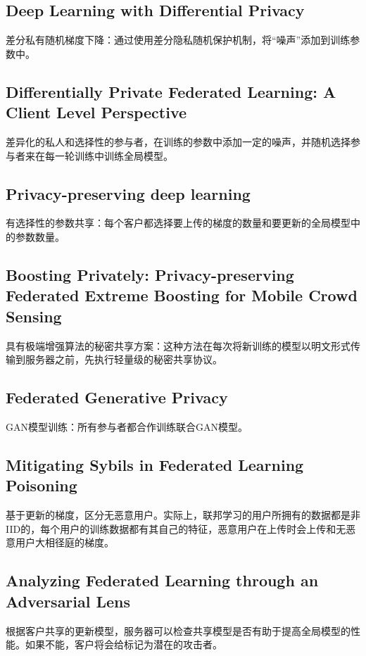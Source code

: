 \documentclass[12pt, a4paper]{article}
\begin{document}
        \subsection*{Deep Learning with Differential Privacy\cite{Abadi_2016}}
            差分私有随机梯度下降：通过使用差分隐私随机保护机制，将“噪声”添加到训练参数中。
        \subsection*{Differentially Private Federated Learning: A Client Level Perspective\cite{geyer2018differentially}}
            差异化的私人和选择性的参与者，在训练的参数中添加一定的噪声，并随机选择参与者来在每一轮训练中训练全局模型。
        \subsection*{Privacy-preserving deep learning\cite{7447103}}
            有选择性的参数共享：每个客户都选择要上传的梯度的数量和要更新的全局模型中的参数数量。
        \subsection*{Boosting Privately: Privacy-preserving Federated Extreme Boosting for Mobile Crowd Sensing}
            具有极端增强算法的秘密共享方案：这种方法在每次将新训练的模型以明文形式传输到服务器之前，先执行轻量级的秘密共享协议。
        \subsection*{Federated Generative Privacy\cite{9091604}}
            GAN模型训练：所有参与者都合作训练联合​​GAN模型。
        \subsection*{Mitigating Sybils in Federated Learning Poisoning\cite{fung2020mitigating}}
            基于更新的梯度，区分无恶意用户。实际上，联邦学习的用户所拥有的数据都是非IID的，每个用户的训练数据都有其自己的特征，恶意用户在上传时会上传和无恶意用户大相径庭的梯度。
        \subsection*{Analyzing Federated Learning through an Adversarial Lens\cite{bhagoji2019analyzing}}
            根据客户共享的更新模型，服务器可以检查共享模型是否有助于提高全局模型的性能。如果不能，客户将会给标记为潜在的攻击者。
\end{document}
